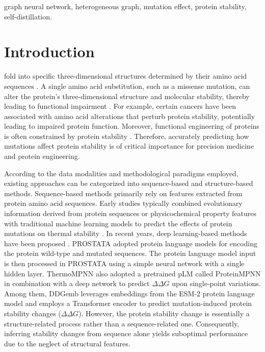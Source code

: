 \documentclass[journal,twoside,web]{ieeecolor}
\begin{document}
\begin{IEEEkeywords}
graph neural network, heterogeneous graph, mutation effect, protein stability, self-distillation.
\end{IEEEkeywords}

\section{Introduction}
\label{sec:introduction}

 fold into specific three-dimensional structures determined by their amino acid sequences \cite{Guerois2002_a}. A single amino acid substitution, such as a missense mutation, can alter the protein's three-dimensional structure and molecular stability, thereby leading to functional impairment \cite{May2025}. For example, certain cancers have been associated with amino acid alterations that perturb protein stability, potentially leading to impaired protein function. Moreover, functional engineering of proteins is often constrained by protein stability \cite{Socha2013,Petrosino2021_a,Chilln-Pino2024}. Therefore, accurately predicting how mutations affect protein stability is of critical importance for precision medicine and protein engineering.

According to the data modalities and methodological paradigms employed, existing approaches can be categorized into sequence-based and structure-based methods. Sequence-based methods primarily rely on features extracted from protein amino acid sequences. Early studies typically combined evolutionary information derived from protein sequences or physicochemical property features with traditional machine learning models to predict the effects of protein mutations on thermal stability \cite{Capriotti2005_a,Cheng2006_a,Li2021,Fariselli2015_a}. In recent years, deep learning-based methods have been proposed \cite{Gong2023_c,Pancotti2021_a,Cuturello2024}. PROSTATA \cite{Umerenkov2023} adopted protein language models for encoding the protein wild-type and mutated sequences. The protein language model input is then processed in PROSTATA using a simple neural network with a single hidden layer. ThermoMPNN \cite{Dieckhaus2024} also adopted a pretrained pLM called ProteinMPNN \cite{Dauparas2022} in combination with a deep network to predict $\Delta\Delta G$ upon single-point variations. Among them, DDGemb \cite{Savojardo2024} leverages embeddings from the ESM-2 \cite{Lin2023_a} protein language model and employs a Transformer encoder to predict mutation-induced protein stability changes ($\Delta\Delta G$). However, the protein stability change is essentially a structure-related process rather than a sequence-related one. Consequently, inferring stability changes from sequence alone yields suboptimal performance due to the neglect of structural features.
\end{document}
